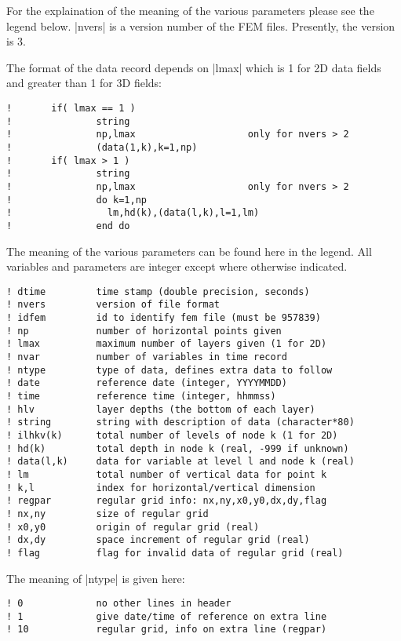 For the explaination of the meaning of the various parameters please
see the legend below. |nvers| is a version number of the FEM files. Presently,
the version is 3.

The format of the data record depends on |lmax| which is 1 for 2D data
fields and greater than 1 for 3D fields:

\begin{verbatim}
!       if( lmax == 1 )
!               string
!               np,lmax                    only for nvers > 2
!               (data(1,k),k=1,np)
!       if( lmax > 1 )
!               string
!               np,lmax                    only for nvers > 2
!               do k=1,np
!                 lm,hd(k),(data(l,k),l=1,lm)
!               end do
\end{verbatim}

The meaning of the various parameters can be found here in the legend.
All variables and parameters are integer except where otherwise indicated.

\begin{verbatim}
! dtime         time stamp (double precision, seconds)
! nvers         version of file format
! idfem         id to identify fem file (must be 957839)
! np            number of horizontal points given
! lmax          maximum number of layers given (1 for 2D)
! nvar          number of variables in time record
! ntype         type of data, defines extra data to follow
! date          reference date (integer, YYYYMMDD)
! time          reference time (integer, hhmmss)
! hlv           layer depths (the bottom of each layer)
! string        string with description of data (character*80)
! ilhkv(k)      total number of levels of node k (1 for 2D)
! hd(k)         total depth in node k (real, -999 if unknown)
! data(l,k)     data for variable at level l and node k (real)
! lm            total number of vertical data for point k
! k,l           index for horizontal/vertical dimension
! regpar        regular grid info: nx,ny,x0,y0,dx,dy,flag
! nx,ny         size of regular grid
! x0,y0         origin of regular grid (real)
! dx,dy         space increment of regular grid (real)
! flag          flag for invalid data of regular grid (real)
\end{verbatim}

The meaning of |ntype| is given here:

\begin{verbatim}
! 0             no other lines in header
! 1             give date/time of reference on extra line
! 10            regular grid, info on extra line (regpar)
\end{verbatim}

